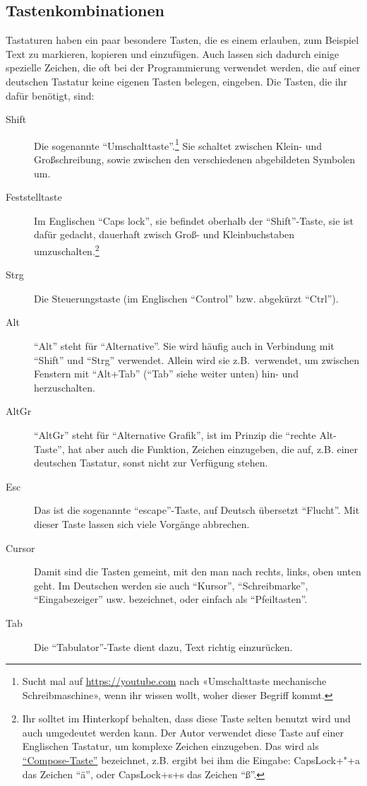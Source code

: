 \subsection{Tastenkombinationen}
\label{sec:ref::hotkeys}

Tastaturen haben ein paar besondere Tasten, die es einem erlauben, zum Beispiel Text zu markieren, kopieren und einzufügen. Auch lassen sich dadurch einige spezielle Zeichen, die oft bei der Programmierung verwendet werden, die auf einer deutschen Tastatur keine eigenen Tasten belegen, eingeben. Die Tasten, die ihr dafür benötigt, sind:
\begin{description}
    \item[Shift]
        Die sogenannte ``Umschalttaste''.\footnote{%
            Sucht mal auf \url{https://youtube.com} nach «Umschalttaste mechanische Schreibmaschine», wenn ihr wissen wollt, woher dieser Begriff kommt.}%
        Sie schaltet zwischen Klein- und Großschreibung, sowie zwischen den verschiedenen abgebildeten Symbolen um.
    \item[Feststelltaste]
        Im Englischen ``Caps lock'', sie befindet oberhalb der ``Shift''-Taste, sie ist dafür gedacht, dauerhaft zwisch Groß- und Kleinbuchstaben umzuschalten.\footnote{%
            Ihr solltet im Hinterkopf behalten, dass diese Taste selten benutzt wird und auch umgedeutet werden kann. Der Autor verwendet diese Taste auf einer Englischen Tastatur, um komplexe Zeichen einzugeben. Das wird als \href{https://de.wikipedia.org/wiki/Compose-Taste}{``Compose-Taste''} bezeichnet, z.B. ergibt bei ihm die Eingabe: CapsLock+"+a das Zeichen ``ä'', oder CapsLock+s+s das Zeichen ``ß''.
        }
    \item[Strg]
        Die Steuerungstaste (im Englischen ``Control'' bzw. abgekürzt ``Ctrl'').
    \item[Alt]
        ``Alt'' steht für ``Alternative''. Sie wird häufig auch in Verbindung mit ``Shift'' und ``Strg'' verwendet. Allein wird sie z.B.\ verwendet, um zwischen Fenstern mit ``Alt+Tab'' (``Tab'' siehe weiter unten) hin- und herzuschalten.
    \item[AltGr]
        ``AltGr'' steht für ``Alternative Grafik'', ist im Prinzip die ``rechte Alt-Taste'', hat aber auch die Funktion, Zeichen einzugeben, die auf, z.B. einer deutschen Tastatur, sonst nicht zur Verfügung stehen.
    \item[Esc]
        Das ist die sogenannte ``escape''-Taste, auf Deutsch übersetzt ``Flucht''. Mit dieser Taste lassen sich viele Vorgänge abbrechen.
    \item[Cursor]
        Damit sind die Tasten gemeint, mit den man nach rechts, links, oben unten geht. Im Deutschen werden sie auch ``Kursor'', ``Schreibmarke'', ``Eingabezeiger'' usw. bezeichnet, oder einfach als ``Pfeiltasten''.
    \item[Tab]
        Die ``Tabulator''-Taste dient dazu, Text richtig einzurücken.
\end{description}

